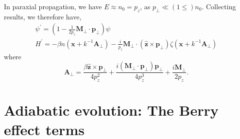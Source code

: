 \documentclass[aps,pra,preprint,superscriptaddress,showpacs,showkeys]{revtex4}
\begin{document}
In paraxial propagation, we have $E\approx n_0=p_z$, as $p_\bot\ll (1 \le)n_0$. Collecting results, we therefore have,
\begin{eqnarray}
\psi^\prime=(1-\frac{1}{2p_z}\textbf{M}_\bot\cdot\textbf{p}_\bot)\psi \ \ \ \ \ \ \ \ \ \ \ \ \ \ \ \ \ \ \ \ \nonumber\\
H^\prime=-\beta n(\textbf{x}+k^{-1}\textbf{A}_\bot)-\frac{i}{p_z}\textbf{M}_\bot \cdot (\hat{\textbf{z}} \times \textbf{p}_\bot)\zeta(\textbf{x}+k^{-1}\textbf{A}_\bot) \label{q}
\end{eqnarray}
where
$$
\textbf{A}_\bot=\frac{\beta\hat{\textbf{z}}\times\textbf{p}_\bot}{4p_z^2}+\frac{i(\textbf{M}_\bot\cdot\textbf{p}_\bot)\textbf{p}_\bot}{4p_z^3}
+\frac{i\textbf{M}_\bot}{2p_z} .
$$

\section{Adiabatic evolution: The Berry effect terms}
\end{document}
